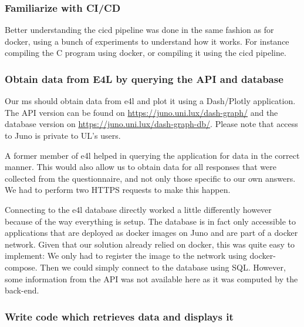 \subsubsection{Familiarize with CI/CD}

Better understanding the \gls{cicd} pipeline was done in the same
fashion as for docker, using a bunch of experiments to understand how
it works. For instance compiling the C program using docker, or
compiling it using the \gls{cicd} pipeline.

\subsubsection{Obtain data from E4L by querying the API and database}
\label{sec:e4l-data-query}

Our \gls{ms} should obtain data from \gls{e4l} and plot it using
a Dash/Plotly application. The API version can be found on
\url{https://juno.uni.lux/dash-graph/} and the database version on
\url{https://juno.uni.lux/dash-graph-db/}. Please note that access to
Juno is private to UL's users.


A former member of \gls{e4l} helped in querying the application for
data in the correct manner. This would also allow us to obtain data
for all responses that were collected from the questionnaire, and not
only those specific to our own answers. We had to perform two HTTPS
requests to make this happen.

Connecting to the \gls{e4l} database directly worked a little
differently however because of the way everything is setup. The
database is in fact only accessible to applications that are deployed
as docker images on Juno and are part of a docker network. Given that
our solution already relied on docker, this was quite easy to
implement: We only had to register the image to the network using
docker-compose. Then we could simply connect to the database using
SQL. However, some information from the API was not available here as it was
computed by the back-end.

\subsubsection{Write code which retrieves data and displays it}

